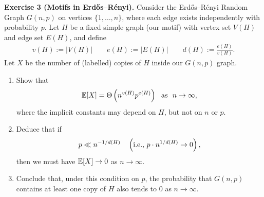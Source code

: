 \documentclass{article}
\begin{document}
\vspace{12pt}

\begin{tcolorbox}[colback = gray!16, enhanced, boxrule=0pt, frame hidden, sharp corners, borderline west={3pt}{-1.5pt}{black!80},breakable]
\textbf{Exercise 3 (Motifs in Erd\H{o}s--R\'enyi).} Consider the Erd\H{o}s--R\'enyi Random Graph $G(n,p)$ on vertices $\{1,\hdots, n\}$, where each edge exists independently with probability $p$. Let $H$ be a fixed simple graph (our motif) with vertex set $V(H)$ and edge set $E(H)$, and define 
\begin{align}
    v(H) := |V(H)|\quad\quad e(H) := |E(H)|\quad\quad d(H) := \frac{e(H)}{v(H)}.
\end{align}
Let $X$ be the number of (labelled) copies of $H$ inside our $G(n, p)$ graph.
\begin{enumerate}[$(a)$]
    \item Show that 
    \begin{align}
        \mathbb{E}[X] = \Theta\left(n^{v(H)}p^{e(H)}\right)\ \text{ as } \ n\to\infty,
    \end{align}
    where the implicit constants may depend on $H$, but not on $n$ or $p$. 
    \item Deduce that if 
    \begin{align}
        p \ll n^{-1/d(H)}\quad \left(\text{i.e., } p\cdot n^{1/d(H)} \to 0\right),
    \end{align}
    then we must have $\mathbb{E}[X] \to 0$ as $n\to\infty$.
    \item Conclude that, under this condition on $p$, the probability that $G(n,p)$ contains at
least one copy of $H$ also tends to 0 as $n\to\infty$. 
\end{enumerate}
\end{tcolorbox}
\end{document}
